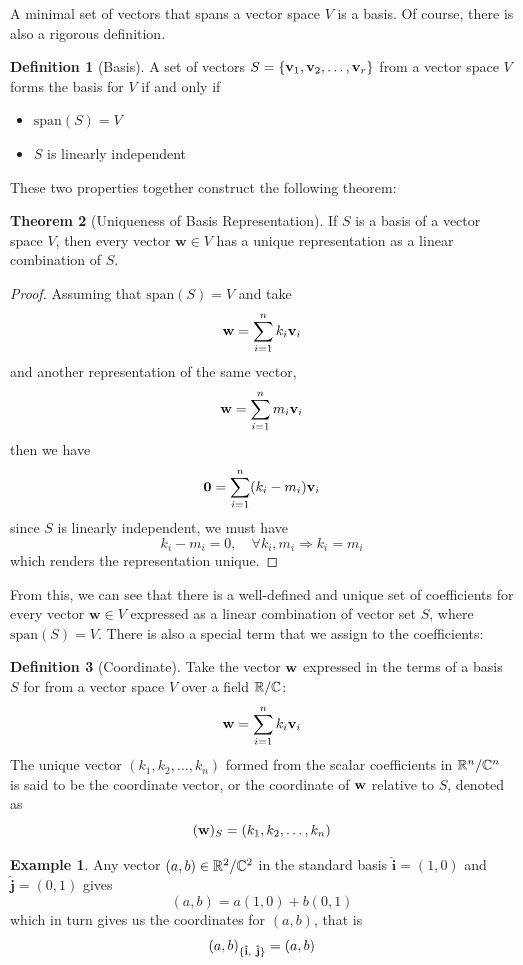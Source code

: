 \documentclass[12pt]{article}
\theoremstyle{definition}
\newtheorem{theorem}{Theorem}[section]
\newtheorem{definition}[theorem]{Definition}
\newtheorem*{example}{Example}
\begin{document}
A minimal set of vectors that spans a vector space $V$ is a basis. Of course, there is also a rigorous definition.

\begin{definition}[Basis]
    A set of vectors $S = \{\mathbf{v}_1, \mathbf{v}_2, \ldots, \mathbf{v}_r\}$ from a vector space $V$ forms the basis for $V$ if and only if 
    \begin{itemize}
        \item $\text{span}(S) = V$
        \item $S$ is linearly independent
    \end{itemize}
\end{definition}

These two properties together construct the following theorem:

\begin{theorem}[Uniqueness of Basis Representation]
    If $S$ is a basis of a vector space $V$, then every vector $\mathbf{w} \in V$ has a unique representation as a linear combination of $S$. 
\end{theorem}

\begin{proof}
    Assuming that $\text{span}(S) = V$ and take 
    $$\mathbf{w} = \sum_{i=1}^{n}k_i \mathbf{v}_i$$
    and another representation of the same vector, 
    $$\mathbf{w} = \sum_{i=1}^{n}m_i \mathbf{v}_i$$
    then we have 
    $$\mathbf{0} = \sum_{i=1}^{n} (k_i - m_i) \mathbf{v}_i$$
    since $S$ is linearly independent, we must have $$k_i - m_i = 0, \quad \forall k_i, m_i \Rightarrow k_i = m_i$$
    which renders the representation unique.
\end{proof}

From this, we can see that there is a well-defined and unique set of coefficients for every vector $\mathbf{w} \in V$ expressed as a linear combination of vector set $S$, where $\text{span}(S) = V$. There is also a special term that we assign to the coefficients:

\begin{definition}[Coordinate]
    Take the vector $\mathbf{w}$ expressed in the terms of a basis $S$ for from a vector space $V$ over a field $\mathbb{R}/\mathbb{C}$:
    $$\mathbf{w} = \sum_{i=1}^{n}k_i \mathbf{v}_i$$
    The unique vector $(k_1, k_2, \ldots, k_n)$ formed from the scalar coefficients in $\mathbb{R}^n/\mathbb{C}^n$ is said to be the coordinate vector, or the coordinate of $\mathbf{w}$ relative to $S$, denoted as $$(\mathbf{w})_S = (k_1, k_2, \ldots, k_n)$$
\end{definition}

\begin{example}
    Any vector $(a, b) \in \mathbb{R}^2/\mathbb{C}^2$ in the standard basis $\mathbf{\hat{i}} = (1, 0)$ and $\mathbf{\hat{j}} = (0, 1)$ gives 
    $$(a, b) = a(1, 0) + b(0, 1)$$ which in turn gives us the coordinates for $(a, b)$, that is 
    $$(a, b)_{\{\mathbf{\hat{i}},\ \mathbf{\hat{j}}\}} = (a, b)$$
\end{example}
\end{document}
